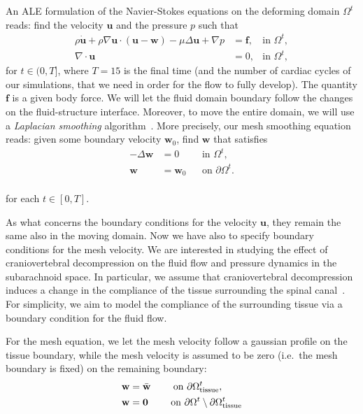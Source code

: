 \documentclass[a4paper,11pt,openright,twoside]{book}
\begin{document}
An ALE formulation of the Navier-Stokes equations on the deforming
domain $\Omega^t$ reads: find the velocity $\mathbf{u}$ and the
pressure $p$ such that
\begin{align}
  \label{eq:ns:1}
  \rho \dot{\mathbf{u}}
  + \rho \nabla \mathbf{u} \cdot (\mathbf{u} - \mathbf{w})
  - \mu \Delta \mathbf{u} + \nabla p
  &= \mathbf{f},  & \text{in } \Omega^t, \\
  \label{eq:ns:2}
  \nabla \cdot \mathbf{u} &= 0, & \text{in } \Omega^t,
\end{align}
for $t \in (0, T]$, where $T=15$ is the final time (and the number of cardiac cycles of our simulations, that we need in order for the flow to fully develop). The quantity $\mathbf{f}$ is a given body force.
We will let the fluid domain boundary follow the changes on the
fluid-structure interface. Moreover, to move the entire domain, we
will use a \emph{Laplacian smoothing}
algorithm~\cite{Winslow1963}. More precisely, our mesh smoothing
equation reads: given some boundary velocity $\mathbf{w}_0$, find
$\mathbf{w}$ that satisfies
\begin{align}
\label{eq:bc:2}
- \Delta \mathbf{w} &= 0 	&& \text{in } \Omega^t, \\
\mathbf{w} &= \mathbf{w}_0 && \text{on } \partial \Omega^t .
\end{align}
\\
for each $t \in [0, T]$.



As what concerns the boundary conditions for the velocity $\mathbf{u}$, they remain the same also in the moving domain.
Now we have also to specify boundary conditions for the mesh velocity. We are interested in studying the effect of craniovertebral
decompression on the fluid flow and pressure dynamics in the
subarachnoid space. In particular, we assume that craniovertebral
decompression induces a change in the compliance of the tissue
surrounding the spinal canal~\cite{}. For simplicity, we aim to model
the compliance of the surrounding tissue via a boundary condition for
the fluid flow. 

For the mesh equation, we let the mesh velocity follow a gaussian profile on the tissue boundary, while the mesh velocity is assumed to
be zero (i.e.~the mesh boundary is fixed) on the remaining boundary:
\begin{align}
\label{eq:bc:5}
\mathbf{w} &= \bar{\mathbf{w}}  \qquad \text{ on } \partial \Omega_{\rm tissue}^t,\\
\mathbf{w} &= \mathbf{0}  \qquad \text{ on } \partial \Omega^t \setminus \partial \Omega_{\rm tissue}^t
\end{align}
\end{document}
